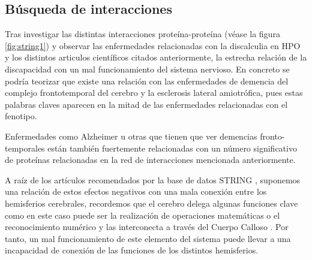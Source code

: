 \hfill

\subsection{Búsqueda de interacciones}

Tras investigar las distintas interacciones proteína-proteína (véase la figura \ref{fig:string1}) y observar las enfermedades relacionadas con la discalculia en HPO y los distintos articulos científicos citados anteriormente, la estrecha relación de la discapacidad con un mal funcionamiento del sistema nervioso. En concreto se podría teorizar que existe una relación con las enfermedades de demencia del complejo frontotemporal del cerebro y la esclerosis lateral amiotrófica, pues estas palabras claves aparecen en la mitad de las enfermedades relacionadas con el fenotipo.

\hfill

Enfermedades como Alzheimer u otras que tienen que ver demencias fronto-temporales \cite{Walterfang2014} están también fuertemente relacionadas con un número significativo de proteínas relacionadas en la red de interacciones mencionada anteriormente.

\hfill

A raíz de los artículos recomendados por la base de datos STRING \cite{Walterfang2014,frontotemporal}, suponemos una relación de estos efectos negativos con una mala conexión entre los hemisferios cerebrales, recordemos que el cerebro delega algunas funciones clave como en este caso puede ser la realización de operaciones matemáticas o el reconocimiento numérico y las interconecta a través del Cuerpo Calloso \cite{CorpusCallosum}. Por tanto, un mal funcionamiento de este elemento del sistema puede llevar a una incapacidad de conexión de las funciones de los distintos hemisferios.

\hfill